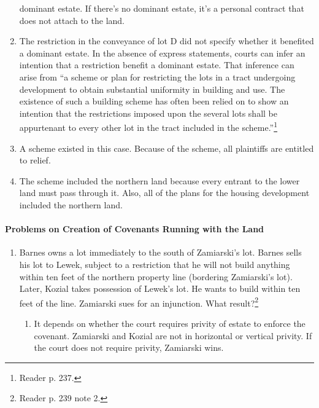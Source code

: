 \begin{enumerate}
    dominant estate. If there's no dominant estate, it's a personal contract 
    that does not attach to the land.
    \item The restriction in the conveyance of lot D did not specify whether 
    it benefited a dominant estate. In the absence of express statements, 
    courts can infer an intention that a restriction benefit a dominant 
    estate. That inference can arise from ``a scheme or plan for restricting 
    the lots in a tract undergoing development to obtain substantial 
    uniformity in building and use. The existence of such a building scheme 
    has often been relied on to show an intention that the restrictions 
    imposed upon the several lots shall be appurtenant to every other lot in 
    the tract included in the scheme.''\footnote{Reader p. 237.}
    \item A scheme existed in this case. Because of the scheme, all plaintiffs 
    are entitled to relief.
    \item The scheme included the northern land because every entrant to the 
    lower land must pass through it. Also, all of the plans for the housing 
    development included the northern land.
\end{enumerate}

\paragraph{Problems on Creation of Covenants Running with the Land}

\begin{enumerate}
    \item Barnes owns a lot immediately to the south of Zamiarski's lot. 
    Barnes sells his lot to Lewek, subject to a restriction that he will not 
    build anything within ten feet of the northern property line (bordering 
    Zamiarski's lot). Later, Kozial takes possession of Lewek's lot. He wants 
    to build within ten feet of the line. Zamiarski sues for an injunction. 
    What result?\footnote{Reader p. 239 note 2.}
    \begin{enumerate}
        \item It depends on whether the court requires privity of estate to 
        enforce the covenant. Zamiarski and Kozial are not in horizontal or 
        vertical privity. If the court does not require privity, Zamiarski 
        wins.
    \end{enumerate}
\end{enumerate}

